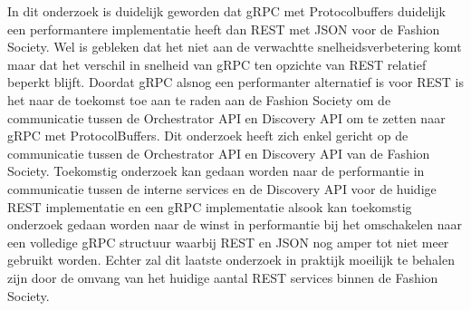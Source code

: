 In dit onderzoek is duidelijk geworden dat gRPC met Protocolbuffers duidelijk een performantere implementatie heeft dan REST met JSON voor de Fashion Society. Wel is gebleken dat het niet aan de verwachtte snelheidsverbetering komt maar dat het verschil in snelheid van gRPC ten opzichte van REST relatief beperkt blijft. Doordat gRPC alsnog een performanter alternatief is voor REST is het naar de toekomst toe aan te raden aan de Fashion Society om de communicatie tussen de Orchestrator API en Discovery API om te zetten naar gRPC met ProtocolBuffers.
 Dit onderzoek heeft zich enkel gericht op de communicatie tussen de Orchestrator API en Discovery API van de Fashion Society. Toekomstig onderzoek kan gedaan worden naar de performantie in communicatie tussen de interne services en de Discovery API voor de huidige REST implementatie en een gRPC implementatie alsook kan toekomstig onderzoek gedaan worden naar de winst in performantie bij het omschakelen naar een volledige gRPC structuur waarbij REST en JSON nog amper tot niet meer gebruikt worden. Echter zal dit laatste onderzoek in praktijk moeilijk te behalen zijn door de omvang van het huidige aantal REST services binnen de Fashion Society.
